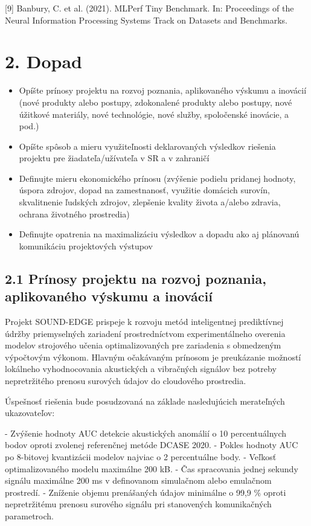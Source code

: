 \documentclass[10pt,a4paper]{article}
\begin{document}
[9] Banbury, C. et al. (2021). MLPerf Tiny Benchmark. In: Proceedings of the Neural Information Processing Systems Track on Datasets and Benchmarks.

\section*{2. Dopad}

\begin{itemize}[leftmargin=1.5em,
                itemsep=0pt,
                topsep=2pt]
\item Opíšte prínosy projektu na rozvoj poznania, aplikovaného výskumu a inovácií (nové produkty alebo postupy, zdokonalené produkty alebo postupy, nové úžitkové materiály, nové technológie, nové služby, spoločenské inovácie, a pod.)
\item Opíšte spôsob a mieru využiteľnosti deklarovaných výsledkov riešenia projektu pre žiadateľa/užívateľa v SR a v zahraničí
\item Definujte mieru ekonomického prínosu (zvýšenie podielu pridanej hodnoty, úspora zdrojov, dopad na zamestnanosť, využitie domácich surovín, skvalitnenie ľudských zdrojov, zlepšenie kvality života a/alebo zdravia, ochrana životného prostredia)
\item Definujte opatrenia na maximalizáciu výsledkov a dopadu ako aj plánovanú komunikáciu projektových výstupov
\end{itemize}

\subsection*{2.1 Prínosy projektu na rozvoj poznania,
aplikovaného výskumu a inovácií}

Projekt SOUND-EDGE prispeje k rozvoju metód inteligentnej prediktívnej údržby priemyselných zariadení prostredníctvom experimentálneho overenia modelov strojového učenia optimalizovaných pre zariadenia s obmedzeným výpočtovým výkonom. Hlavným očakávaným prínosom je preukázanie možností lokálneho vyhodnocovania akustických a vibračných signálov bez potreby nepretržitého prenosu surových údajov do cloudového prostredia.

Úspešnosť riešenia bude posudzovaná na základe nasledujúcich merateľných ukazovateľov:

- Zvýšenie hodnoty AUC detekcie akustických anomálií o 10 percentuálnych bodov oproti zvolenej referenčnej metóde DCASE 2020.
- Pokles hodnoty AUC po 8-bitovej kvantizácii modelov najviac o 2 percentuálne body.
- Veľkosť optimalizovaného modelu maximálne 200 kB.
- Čas spracovania jednej sekundy signálu maximálne 200 ms v definovanom simulačnom alebo emulačnom prostredí.
- Zníženie objemu prenášaných údajov minimálne o 99,9 \% oproti nepretržitému prenosu surového signálu pri stanovených komunikačných parametroch.
\end{document}
